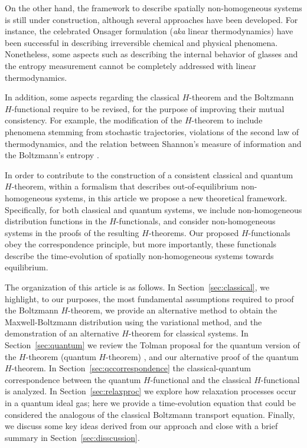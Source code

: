 On the other hand, the framework to describe spatially non-homogeneous systems is still
under construction, although several approaches have been developed. For instance,
the celebrated Onsager formulation (\textit{aka} linear thermodynamics)
\cite{bib:keizer1987,bib:onsager1931} have been successful in describing irreversible chemical 
and physical phenomena. Nonetheless, some aspects such as describing the internal behavior of glasses
\cite{bib:zanotto2018} and the entropy measurement
\cite{bib:schmelzer2018,bib:nemilov2018} cannot be completely addressed with linear thermodynamics.

In addition, some aspects regarding the classical $H$-theorem and the
Boltzmann $H$-functional require to be revised, for the purpose of improving their mutual consistency.
For example, the modification of the $H$-theorem to include phenomena stemming from stochastic
trajectories, violations of the second law of thermodynamics, and the relation
between Shannon's measure of information and the Boltzmann's entropy
\cite{bib:nemilov2018,bib:keizer1987,bib:onsager1931,bib:brown2008,bib:dragoljub2009}.

In order to contribute to the construction of a consistent classical and
quantum $H$-theorem, within a formalism that describes out-of-equilibrium
non-homogeneous systems, in this article we propose a new theoretical framework.
Specifically, for both classical and quantum systems, we include non-homogeneous distribution functions in
the $H$-functionals, and consider non-homogeneous systems in the proofs of the resulting
$H$-theorems. Our proposed $H$-functionals obey
the correspondence principle, but more importantly, these functionals describe
the time-evolution of spatially non-homogeneous
systems towards equilibrium.

The organization of this article is as follows.
In Section~\ref{sec:classical}, we highlight, to our purposes, the most
fundamental assumptions required to proof the Boltzmann $H$-theorem,
we provide an alternative method to obtain the Maxwell-Boltzmann
distribution using the variational method, and the demonstration of
an alternative $H$-theorem for classical systems. In Section~\ref{sec:quantum}
we review the Tolman proposal for the quantum
version of the $H$-theorem (quantum $H$-theorem)
,
and our alternative proof of the quantum $H$-theorem. In 
Section~\ref{sec:qccorrespondence}
the classical-quantum correspondence between the
quantum $H$-functional and the classical $H$-functional is analyzed.
In Section~\ref{sec:relaxproc} we explore how relaxation processes occur
in a quantum ideal gas; here we provide a time-evolution equation that could be
considered the analogous of the classical Boltzmann transport equation. Finally,
we discuss some key ideas derived from our approach and close with a brief summary
in Section~\ref{sec:disscussion}.


